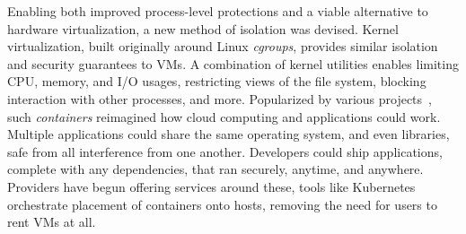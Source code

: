 Enabling both improved process-level protections and a viable alternative to hardware virtualization, a new method of isolation was devised.
Kernel virtualization, built originally around Linux \textit{cgroups}, provides similar isolation and security guarantees to VMs.
A combination of kernel utilities enables limiting CPU, memory, and I/O usages, restricting views of the file system, blocking interaction with other processes, and more.
Popularized by various projects~\cite{oci,docker-main}, such \textit{containers} reimagined how cloud computing and applications could work.
Multiple applications could share the same operating system, and even libraries, safe from all interference from one another.
Developers could ship applications, complete with any dependencies, that ran securely, anytime, and anywhere.
Providers have begun offering services around these, tools like Kubernetes~\cite{kubernetes} orchestrate placement of containers onto hosts, removing the need for users to rent VMs at all.
